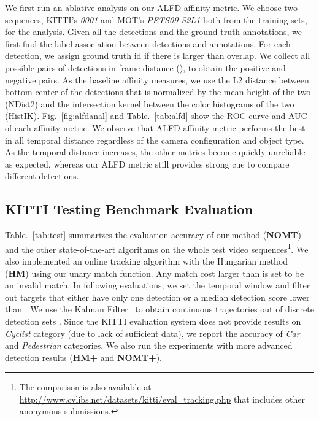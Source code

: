 \documentclass[10pt,twocolumn,letterpaper]{article}
\begin{document}
We first run an ablative analysis on our ALFD affinity metric. We choose two sequences, KITTI's \emph{0001} and MOT's \emph{PETS09-S2L1} both from the training sets, for the analysis. Given all the detections and the ground truth annotations, we first find the label association between detections and annotations. For each detection, we assign ground truth id if there is larger than  overlap. We collect all possible pairs of detections in  frame distance (), to obtain the positive and negative pairs. As the baseline affinity measures, we use the L2 distance between bottom center of the detections that is normalized by the mean height of the two (NDist2) and the intersection kernel between the color histograms of the two (HistIK). Fig.~\ref{fig:alfdanal} and Table.~\ref{tab:alfd} show the ROC curve and AUC of each affinity metric. We observe that ALFD affinity metric performs the best in all temporal distance regardless of the camera configuration and object type. As the temporal distance increases, the other metrics become quickly unreliable as expected, whereas our ALFD metric still provides strong cue to compare different detections.

\subsection{KITTI Testing Benchmark Evaluation}

Table.~\ref{tab:test} summarizes the evaluation accuracy of our method ({\bf NOMT}) and the other state-of-the-art algorithms on the whole  test video sequences\footnote{The comparison is also available at \url{http://www.cvlibs.net/datasets/kitti/eval_tracking.php} that includes other anonymous submissions.}. 
We also implemented an online tracking algorithm with the Hungarian method~\cite{Kuhn_NRLQ_55} ({\bf HM}) using our unary match function. Any match cost larger than  is set to be an invalid match.
In following evaluations, we set the temporal window  and filter out targets that either have only one detection or a median detection score lower than . We use the Kalman Filter~\cite{welch1995introduction} to obtain continuous trajectories out of discrete detection sets .
Since the KITTI evaluation system does not provide results on \emph{Cyclist} category (due to lack of sufficient data), we report the accuracy of \emph{Car} and \emph{Pedestrian} categories. We also run the experiments with more advanced detection results ({\bf HM+\cite{wang2013regionlets}} and {\bf NOMT+\cite{wang2013regionlets}}).
\end{document}
